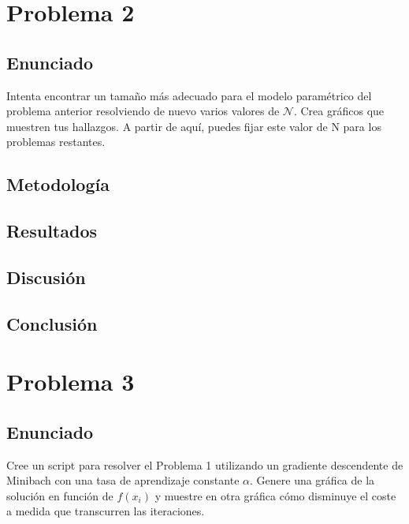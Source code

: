 \documentclass{article}
\begin{document}
\section{Problema 2}

\subsection{Enunciado}

Intenta encontrar un tamaño más adecuado para el modelo paramétrico del problema anterior resolviendo de nuevo varios valores de $\mathcal{N}$. Crea gráficos que muestren tus hallazgos. A partir de aquí, puedes fijar este valor de N para los problemas restantes.

\subsection{Metodología}

\subsection{Resultados}
\setcounter{equation}{0}

\subsection{Discusión}

\subsection{Conclusión}

\section{Problema 3}

\subsection{Enunciado}

Cree un script para resolver el Problema 1 utilizando un gradiente descendente de Minibach con una tasa de aprendizaje constante $\alpha$. Genere una gráfica de la solución en función de $f(x_i)$ y muestre en otra gráfica cómo disminuye el coste a medida que transcurren las iteraciones.
\end{document}

